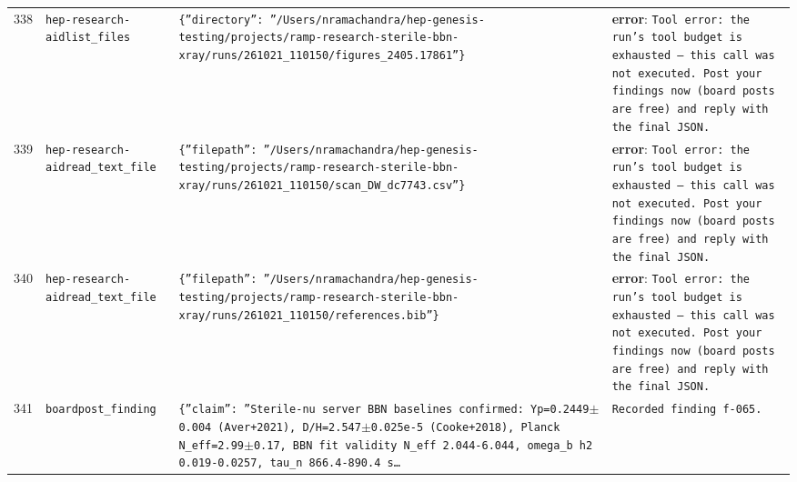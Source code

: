 \documentclass[11pt,a4paper]{article}
\begin{document}
\begin{longtable}{@{}p{}p{}p{}p{}@{}}
338 & \texttt{hep-research-aid}\newline\texttt{list\_\allowbreak{}files} & \texttt{\{''directory'':\allowbreak{} ''/\allowbreak{}Users/\allowbreak{}nramachandra/\allowbreak{}hep-genesis-testing/\allowbreak{}projects/\allowbreak{}ramp-research-sterile-bbn-xray/\allowbreak{}runs/\allowbreak{}261021\_\allowbreak{}110150/\allowbreak{}figures\_\allowbreak{}2405.17861''\}\allowbreak{}} & \textbf{error}: \texttt{Tool error:\allowbreak{} the run's tool budget is exhausted --- this call was not executed. Post your findings now (board posts are free)\allowbreak{} and reply with the final JSON.} \\
339 & \texttt{hep-research-aid}\newline\texttt{read\_\allowbreak{}text\_\allowbreak{}file} & \texttt{\{''filepath'':\allowbreak{} ''/\allowbreak{}Users/\allowbreak{}nramachandra/\allowbreak{}hep-genesis-testing/\allowbreak{}projects/\allowbreak{}ramp-research-sterile-bbn-xray/\allowbreak{}runs/\allowbreak{}261021\_\allowbreak{}110150/\allowbreak{}scan\_\allowbreak{}DW\_\allowbreak{}dc7743.csv''\}\allowbreak{}} & \textbf{error}: \texttt{Tool error:\allowbreak{} the run's tool budget is exhausted --- this call was not executed. Post your findings now (board posts are free)\allowbreak{} and reply with the final JSON.} \\
340 & \texttt{hep-research-aid}\newline\texttt{read\_\allowbreak{}text\_\allowbreak{}file} & \texttt{\{''filepath'':\allowbreak{} ''/\allowbreak{}Users/\allowbreak{}nramachandra/\allowbreak{}hep-genesis-testing/\allowbreak{}projects/\allowbreak{}ramp-research-sterile-bbn-xray/\allowbreak{}runs/\allowbreak{}261021\_\allowbreak{}110150/\allowbreak{}references.bib''\}\allowbreak{}} & \textbf{error}: \texttt{Tool error:\allowbreak{} the run's tool budget is exhausted --- this call was not executed. Post your findings now (board posts are free)\allowbreak{} and reply with the final JSON.} \\
341 & \texttt{board}\newline\texttt{post\_\allowbreak{}finding} & \texttt{\{''claim'':\allowbreak{} ''Sterile-nu server BBN baselines confirmed:\allowbreak{} Yp=\allowbreak{}0.2449$\pm$0.004 (Aver+2021)\allowbreak{},\allowbreak{} D/\allowbreak{}H=\allowbreak{}2.547$\pm$0.025e-5 (Cooke+2018)\allowbreak{},\allowbreak{} Planck N\_\allowbreak{}eff=\allowbreak{}2.99$\pm$0.17,\allowbreak{} BBN fit validity N\_\allowbreak{}eff 2.044-6.044,\allowbreak{} omega\_\allowbreak{}b h2 0.019-0.0257,\allowbreak{} tau\_\allowbreak{}n 866.4-890.4 s\ldots{}\allowbreak{}} & \texttt{Recorded finding f-065.} \\

\end{longtable}
\end{document}
